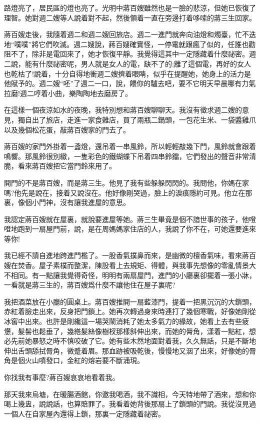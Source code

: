 \documentclass[a6paper]{article}
\begin{document}
路燈亮了，居民區的燈也亮了。光明中蔣百嫂雖然也是一臉的悲涼，但她已恢復了理智。她對週二嫂等人說着對不起，然後領着一直在旁邊打着哆嗦的蔣三生回家。

蔣百嫂走後，我隨着週二和週二嫂回旅店。週二一進門就奔向油燈和燭臺，忙不迭地“噗噗”將它們吹滅。週二嫂說，蔣百嫂確實怪，一停電就跟瘋了似的，任誰也勸阻不了，除非是電回來了，她才恢復平靜。我覺得這其中一定隱藏着什麼祕密。週二說，能有什麼祕密呢，男人就是女人的電，缺不了的;離了這個電，再好的女人也乾枯了!說着，十分自得地衝週二嫂擠着眼睛，似乎在提醒她，她身上的活力是他賦予的。週二嫂“呸”了週二一口，說，餵你的驢去吧，要不它明天早晨哪有力氣拉磨!週二哼着小曲，樂陶陶地去磨房了。

在這樣一個夜涼如水的夜晚，我特別想和蔣百嫂聊聊天。我沒有徵求週二嫂的意見，獨自出了旅店，走進一家食雜店，買了兩瓶二鍋頭，一包花生米、一袋醬雞爪以及幾個松花蛋，敲蔣百嫂家的門去了。

蔣百嫂的家門外掛着一盞燈，還吊着一串風鈴，所以輕輕敲幾下門，風鈴就會跟着鳴響。那風鈴很別緻，一隻彩色的鐵蝴蝶下吊着四串鈴鐺，它們發出的聲音非常清脆，看來蔣百嫂把它當門鈴來用了。

開門的不是蔣百嫂，而是蔣三生。他見了我有些躲躲閃閃的。我問他，你媽在家嗎?他先是說在，接着又說沒在。他好像剛哭過，臉上的淚痕隱約可見。他立在那裏，像個小門神，沒有讓我進屋的意思。

我認定蔣百嫂就在屋裏，就說要進屋等她。蔣三生畢竟是個不諳世事的孩子，他噔噔地跑到一扇屋門前，說，是在周媽媽家住店的人，我說了你不在，可她還要進來等你!

我已經不請自進地跨進門檻了。一股香氣撲鼻而來，是幽微的檀香氣味，看來蔣百嫂在焚香。屋子素樸而整潔，陳設看上去規矩、得體，與我事先想像的零亂情景大不相同。有一點讓我覺得奇怪，明明有兩扇屋門，進門的小廳裏卻擺着一張小牀，一看就是蔣三生的，蔣百嫂爲什麼不讓他住在屋子裏呢?

我把酒菜放在小廳的圓桌上。蔣百嫂推開一扇藍漆門，提着一把黑沉沉的大鎖頭，赤紅着臉走出來，反身把門鎖上。她再次轉過身來時連打了幾個寒戰，好像她剛從冰窖中出來。也許是剛纔這一場哭鬧消耗了她太多氣力的緣故，她看上去有些疲憊，髮髻也鬆垂了，幾綹髮絲像樹杈那樣斜伸出來，而她的脣角，漾着一點紅，想必先前她暴怒之時不慎咬破了它。她有些木然地面對着我，久久無話，只是不斷地伸出舌頭舔拭脣角，微蹙着眉。那血跡被吸乾後，慢慢地又洇了出來，好像她的脣角是個火山噴發口，金紅的熔岩要不斷涌現。

你找我有事麼?蔣百嫂哀哀地看着我。

那天我來烏塘，在暖腸酒館，你邀我喝酒，我不識相，今天特地帶了酒來，想和你喝上幾盅，說說話，也算賠罪了。我看着她背後那扇上了鎖頭的門說。我從沒見過一個人在自家屋內還得上鎖，那裏一定隱藏着祕密。
\end{document}
